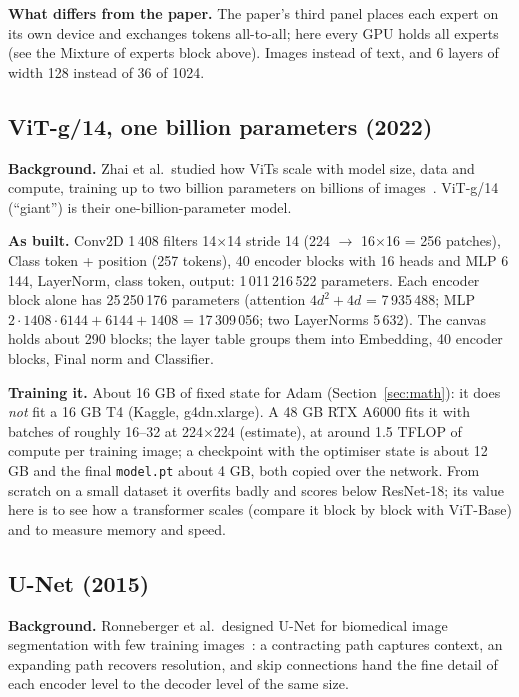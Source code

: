 \documentclass[11pt,a4paper]{article}
\newcommand{\file}[1]{\texttt{#1}}
\begin{document}
\textbf{What differs from the paper.} The paper's third panel places each expert on its own device and exchanges tokens all-to-all; here
every GPU holds all experts (see the Mixture of experts block above). Images instead of text, and 6 layers of width 128 instead of 36 of
1024.

\subsection{ViT-g/14, one billion parameters (2022)}
\textbf{Background.} Zhai et al.\ studied how ViTs scale with model size, data and compute, training up to two billion parameters on
billions of images~\cite{zhai2021scaling}. ViT-g/14 (``giant'') is their one-billion-parameter model.

\textbf{As built.} Conv2D 1\,408 filters 14$\times$14 stride 14 (224 $\rightarrow$ 16$\times$16 = 256 patches), Class token + position
(257 tokens), 40 encoder blocks with 16 heads and MLP 6\,144, LayerNorm, class token, output: 1\,011\,216\,522 parameters. Each encoder
block alone has 25\,250\,176 parameters (attention $4d^2+4d$ = 7\,935\,488; MLP $2\cdot1408\cdot6144+6144+1408$ = 17\,309\,056; two
LayerNorms 5\,632). The canvas holds about 290 blocks; the layer table groups them into Embedding, 40 encoder blocks, Final norm and
Classifier.

\textbf{Training it.} About 16 GB of fixed state for Adam (Section~\ref{sec:math}): it does \emph{not} fit a 16 GB T4 (Kaggle,
g4dn.xlarge). A 48 GB RTX A6000 fits it with batches of roughly 16--32 at 224$\times$224 (estimate), at around 1.5 TFLOP of compute per
training image; a checkpoint with the optimiser state is about 12 GB and the final \file{model.pt} about 4 GB, both copied over the
network. From scratch on a small dataset it overfits badly and scores below ResNet-18; its value here is to see how a transformer scales
(compare it block by block with ViT-Base) and to measure memory and speed.

\subsection{U-Net (2015)}
\textbf{Background.} Ronneberger et al.\ designed U-Net for biomedical image segmentation with few training images~\cite{ronneberger2015unet}:
a contracting path captures context, an expanding path recovers resolution, and skip connections hand the fine detail of each encoder
level to the decoder level of the same size.
\end{document}
